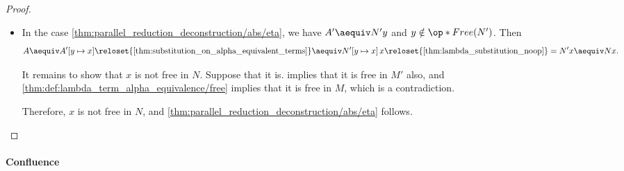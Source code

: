 \begin{proof}
\begin{itemize}
\begin{itemize}
      Let \( B \coloneqq B'[y \mapsto x] \). Then \cref{thm:substitution_on_parallel_reduction} implies that \( A'[y \mapsto x] \ppred B \) and \ref{inf:def:lambda_term_reduction/alpha} implies that \( A \ppred B \).

      Furthermore, we have
      \begin{equation*}
        N
        \aequiv
        N'
        \aequiv
        \qabs y B'
        \reloset {\eqref{eq:thm:alpha_conversion}} \aequiv
        \qabs x B.
      \end{equation*}

      We conclude that \ref{thm:parallel_reduction_deconstruction/abs/lift} holds.

      \item In the case \ref{thm:parallel_reduction_deconstruction/abs/eta}, we have \( A' \aequiv N'y \) and \( y \notin \op*{Free}(N') \). Then
      \begin{equation*}
        A
        \aequiv
        A'[y \mapsto x]
        \reloset {\ref{thm:substitution_on_alpha_equivalent_terms}} \aequiv
        N'[y \mapsto x] \thinspace x
        \reloset {\ref{thm:lambda_substitution_noop}} =
        N' x
        \aequiv
        N x.
      \end{equation*}

      It remains to show that \( x \) is not free in \( N \). Suppose that it is.  implies that it is free in \( M' \) also, and \cref{thm:def:lambda_term_alpha_equivalence/free} implies that it is free in \( M \), which is a contradiction.

      Therefore, \( x \) is not free in \( N \), and \ref{thm:parallel_reduction_deconstruction/abs/eta} follows.
    \end{itemize}
  \end{itemize}
\end{proof}

\paragraph{Confluence}

